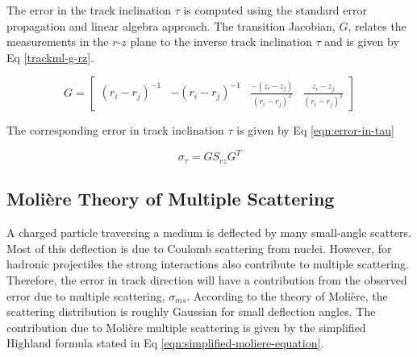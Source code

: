 The error in the track inclination $\tau$ is computed using the standard error propagation and linear algebra approach. The transition Jacobian, $G$, relates the measurements in the $r$-$z$ plane to the inverse track inclination $\tau$ and is given by Eq \eqref{trackml-g-rz}.




\begin{equation}
    G = \begin{bmatrix} 
            (r_i - r_j)^{-1} &
            -(r_i - r_j)^{-1} & 
            \frac{-(z_i - z_j)}{(r_i - r_j)^2} & 
            \frac{z_i - z_j}{(r_i - r_j)^2}
            \end{bmatrix} 
    \label{trackml-g-rz}
\end{equation}

The corresponding error in track inclination $\tau$ is given by Eq \eqref{eqn:error-in-tau}

\begin{equation}
    \sigma_{\tau} = G S_{rz} G^{T}
    \label{eqn:error-in-tau}
\end{equation}






\subsection{Moli\`ere Theory of Multiple Scattering}

A charged particle traversing a medium is deflected by many small-angle scatters. Most of this deflection is due to Coulomb scattering from nuclei. However, for hadronic projectiles the strong interactions also contribute to multiple scattering. Therefore, the error in track direction will have a contribution from the observed error due to multiple scattering, $\sigma_{ms}$. According to the theory of Moli\`ere, the scattering distribution is roughly Gaussian for small deflection angles. The contribution due to Moli\`ere multiple scattering is given by the simplified Highland formula \cite{moliere-theory-formula, Lynch:1990sq} stated in Eq \eqref{eqn:simplified-moliere-equation}.


